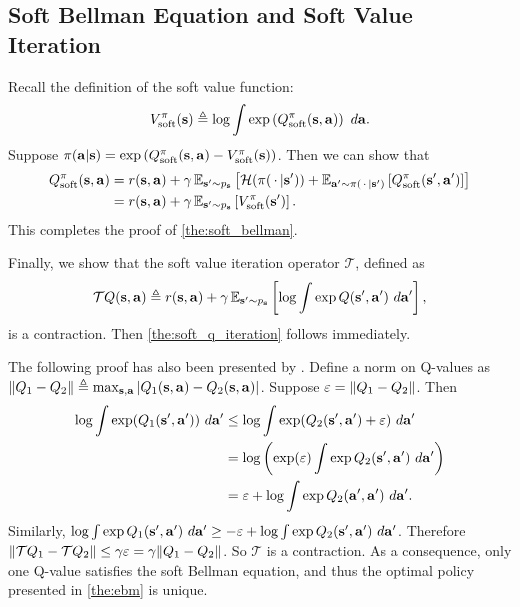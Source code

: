 \subsection{Soft Bellman Equation and Soft Value Iteration}
\label{app:soft_bellman_equation}
Recall the definition of the soft value function:
\begin{equation}
V^{\pi}_{\text{soft}}(\mathbf{s})\triangleq \log \int \exp \left(Q^{\pi}_{\text{soft}}(\mathbf{s},\mathbf{a})\right) \ d\mathbf{a}.
\end{equation}
Suppose $\pi(\mathbf{a}|\mathbf{s}) = \exp\left(Q^{\pi}_{\text{soft}}(\mathbf{s},\mathbf{a}) - V^{\pi}_{\text{soft}}(\mathbf{s})\right)$. Then we can show that
\begin{align}
    Q^{\pi}_{\text{soft}}(\mathbf{s},\mathbf{a}) &= r(\mathbf{s},\mathbf{a}) + \gamma \operatorname{\mathbb{E}}_{\mathbf{s}' \sim p_{\mathbf{s}}}\left[\mathcal{H}(\pi(\,\cdot\, | \mathbf{s}')) + \operatorname{\mathbb{E}}_{\mathbf{a}' \sim \pi (\,\cdot\, | \mathbf{s}')}\left[Q^{\pi}_{\text{soft}}(\mathbf{s}',\mathbf{a}')\right]\right] \notag\\
    &=r(\mathbf{s},\mathbf{a}) + \gamma \operatorname{\mathbb{E}}_{\mathbf{s}' \sim p_{\mathbf{s}}}\left[V^{\pi}_{\text{soft}}(\mathbf{s}')\right].
\end{align}
This completes the proof of \autoref{the:soft_bellman}.

Finally, we show that the soft value iteration operator $\mathcal{T}$, defined as 
\begin{equation}
\mathcal{T}Q(\mathbf{s},\mathbf{a})\triangleq r(\mathbf{s},\mathbf{a}) + \gamma \operatorname{\mathbb{E}}_{\mathbf{s}' \sim p_{\mathbf{s}}}\left[\log \int \exp Q(\mathbf{s}',\mathbf{a}') \ d\mathbf{a}'\right],
\end{equation}
is a contraction. Then \autoref{the:soft_q_iteration} follows immediately.

The following proof has also been presented by \citet{fox2015taming}. Define a norm on Q-values as $\|Q_1 - Q_2\| \triangleq \max_{\mathbf{s},\mathbf{a}} |Q_1(\mathbf{s},\mathbf{a}) - Q_2(\mathbf{s},\mathbf{a})|$. Suppose $\varepsilon = \|Q_1 - Q_2\|$. Then 
\begin{align}
    \log \int \exp (\Q_1(\state',\action')) \ d\action' &\leq \log \int \exp( \Q_2(\state',\action')  + \eps)\ d\action'\notag\\
    &= \log \left(\exp(\eps)\int \exp \Q_2(\state',\action') \ d\action'\right) \notag\\
    &= \eps + \log \int \exp \Q_2(\action',\action') \ d\action'.
\end{align}
Similarly, $\log \int \exp Q_1(\mathbf{s}',\mathbf{a}') \ d\mathbf{a}' \geq -\varepsilon + \log \int \exp Q_2(\mathbf{s}',\mathbf{a}') \ d\mathbf{a}'$. Therefore $\|\mathcal{T}Q_1 - \mathcal{T}Q_2\| \leq \gamma \varepsilon = \gamma \|Q_1 - Q_2\|$. So $\mathcal{T}$ is a contraction. As a consequence, only one Q-value satisfies the soft Bellman equation, and thus the optimal policy presented in \autoref{the:ebm} is unique.










